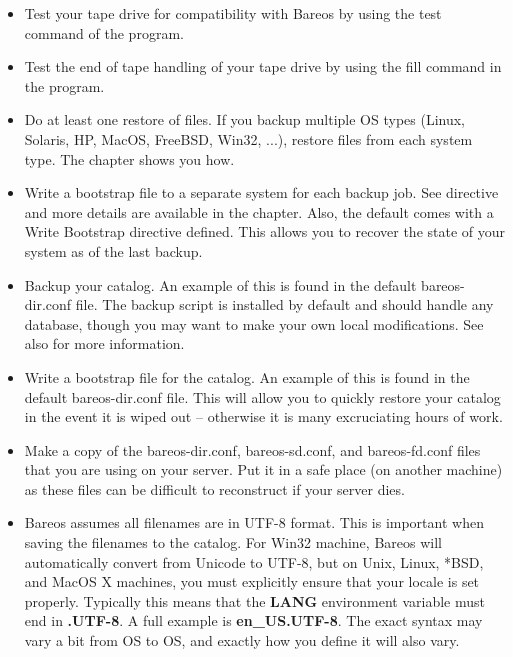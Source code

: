 \begin{itemize}
\item Test your tape drive for compatibility with Bareos by using the test
   command of the  program.
\item Test the end of tape handling of your tape drive by using the
   fill command in the  program.
\item Do at least one restore of files. If you backup multiple OS types
   (Linux, Solaris, HP, MacOS, FreeBSD, Win32, ...),
   restore files from each system type. The
    chapter shows you how.
\item Write a bootstrap file to a separate system for each backup job.
   See  directive and more details are available in the
    chapter. Also, the default
    comes with a Write Bootstrap directive defined. This  allows
   you to recover the state of your system as of the last backup.
\item Backup your catalog. An example of this is found in the default
   bareos-dir.conf file. The backup script is installed by default and
   should handle any database, though you may want to make your own local
   modifications.  See also  for more
   information.
\item Write a bootstrap file for the catalog. An example of this is found in
   the default bareos-dir.conf file. This will allow you to quickly restore your
   catalog in the event it is wiped out -- otherwise it  is many excruciating
   hours of work.
\item Make a copy of the bareos-dir.conf, bareos-sd.conf, and
   bareos-fd.conf files that you are using on your server. Put it in a safe
   place (on another machine) as these files can be difficult to
   reconstruct if your server dies.
\item Bareos assumes all filenames are in UTF-8 format. This is important
   when saving the filenames to the catalog. For Win32 machine, Bareos will
   automatically convert from Unicode to UTF-8, but on Unix, Linux, *BSD,
   and MacOS X machines, you must explicitly ensure that your locale is set
   properly. Typically this means that the {\bf LANG} environment variable
   must end in {\bf .UTF-8}. A full example is {\bf en\_US.UTF-8}. The
   exact syntax may vary a bit from OS to OS, and exactly how you define it
   will also vary.


\end{itemize}
